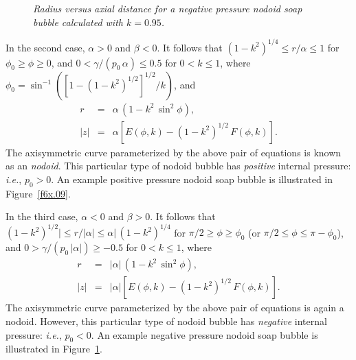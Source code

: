 \begin{figure}
\epsfysize=3.5in
\centerline{}
\caption{\em Radius  versus axial distance for a negative  pressure nodoid soap bubble calculated with $k=0.95$.}\label{f6x.10}
\end{figure}

In the second case, $\alpha>0$ and $\beta<0$. It follows that $(1-k^2)^{1/4}\leq r/\alpha \leq 1$
for $\phi_0\geq \phi\geq 0$, and $0<\gamma/(p_0\,\alpha)\leq 0.5$ for $0< k \leq 1$, where
$\phi_0= \sin^{-1}([1-(1-k^2)^{1/2}]^{1/2}/k)$, and 
\begin{eqnarray}
r &=&\alpha\,(1-k^2\,\sin^2\phi),\\[0.5ex]
|z|&=& \alpha\left[E(\phi,k) -(1-k^2)^{1/2}\,F(\phi,k)\right].
\end{eqnarray}
The axisymmetric curve parameterized by the above pair of equations is known as an {\em nodoid}. This
particular type of nodoid bubble has  {\em positive}\/ internal  pressure: {\em i.e.}, $p_0>0$. 
An example positive pressure nodoid soap bubble is illustrated in Figure~\ref{f6x.09}.

In the third case, $\alpha<0$ and $\beta>0$. It follows that $(1-k^2)^{1/2}|\leq r/|\alpha|\leq \alpha|\,(1-k^2)^{1/4}$
for $\pi/2\geq \phi\geq \phi_0$ (or $\pi/2\leq \phi\leq \pi-\phi_0$), and $0>\gamma/(p_0\,|\alpha|)\geq -0.5$ for $0< k \leq1$, where
\begin{eqnarray}
r &=&|\alpha|\,(1-k^2\,\sin^2\phi),\\[0.5ex]
|z|&=& |\alpha|\left[E(\phi,k) -(1-k^2)^{1/2}\,F(\phi,k)\right].
\end{eqnarray}
The axisymmetric curve parameterized by the above pair of equations is again a nodoid. However, this
particular type of nodoid bubble has  {\em negative}\/ internal pressure: {\em i.e.}, $p_0<0$.
An example negative pressure nodoid soap bubble is illustrated in Figure~\ref{f6x.10}. 

